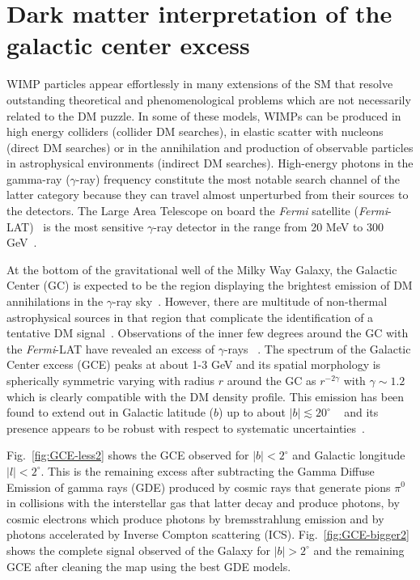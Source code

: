 \section{Dark matter interpretation of the galactic center excess}
\label{sec:intro-gce}
%
WIMP particles appear effortlessly in many extensions of the SM that resolve outstanding theoretical and phenomenological problems which are not necessarily related to the DM puzzle.
 In some of these models, WIMPs can be produced in high energy colliders (collider DM searches), in elastic scatter with nucleons (direct DM searches) or in the annihilation and production of observable particles in astrophysical environments (indirect DM searches).
 High-energy photons in the gamma-ray ($\gamma$-ray) frequency constitute the most notable search channel of the latter category because they can travel almost unperturbed from their sources to the detectors.
 The Large Area Telescope on board the \textit{Fermi} satellite (\textit{Fermi}-LAT)~\cite{Fermi} is the most sensitive $\gamma$-ray detector in the range from 20 MeV to 300 GeV~\cite{Ackermann:2015zua}.

At the bottom of the gravitational well of the Milky Way Galaxy, the Galactic Center (GC) is expected to be the region displaying the brightest emission of DM annihilations in the $\gamma$-ray sky~\cite{Funk:review}.
However, there are multitude of non-thermal astrophysical sources in that region that complicate the identification of a tentative DM signal~\cite{Funk:review}. Observations of the inner few degrees around the GC with the \textit{Fermi}-LAT have revealed an excess of $\gamma$-rays ~\cite{Goodenough2009gk,Vitale:2009hr,Hooper:2010mq,hooper,AbazajianKaplinghat2012,AbazajianKaplinghat2013,GordonMacias2013}. 
The spectrum of the Galactic Center excess (GCE) peaks at about 1-3 GeV and its spatial morphology is spherically symmetric varying with radius $r$ around the GC as $r^{-2\gamma}$ with  $\gamma\sim 1.2$ which is clearly compatible with the DM density profile. 
This emission has been found to extend out in Galactic latitude ($b$) up to about $|b|\lesssim 20^\circ$ ~\cite{hooperslatyer2013,Daylan:2014,CaloreCholisWeniger2015,TheFermi-LAT:2015kwa} and its presence appears  to be robust with respect to systematic uncertainties~\cite{GordonMacias2013,MaciasGordon2014,Daylan:2014,Zho2015,CaloreCholisWeniger2015,PorterMurgia2015,TheFermi-LAT:2015kwa}.

Fig.~\ref{fig:GCE-less2} shows the GCE observed for $|b|<2^{\circ}$ and Galactic longitude $|l|<2^{\circ}$. 
This is the remaining excess after subtracting the Gamma Diffuse Emission of gamma rays (GDE) produced by cosmic rays that generate pions $\pi^0$ in collisions with the interstellar gas that latter decay and produce photons, by cosmic electrons which produce photons by bremsstrahlung emission and by photons accelerated by Inverse Compton scattering (ICS).
Fig.~\ref{fig:GCE-bigger2} shows the complete signal observed of the Galaxy for   $|b|>2^{\circ}$ and the remaining GCE after cleaning the map using the best GDE models. 


